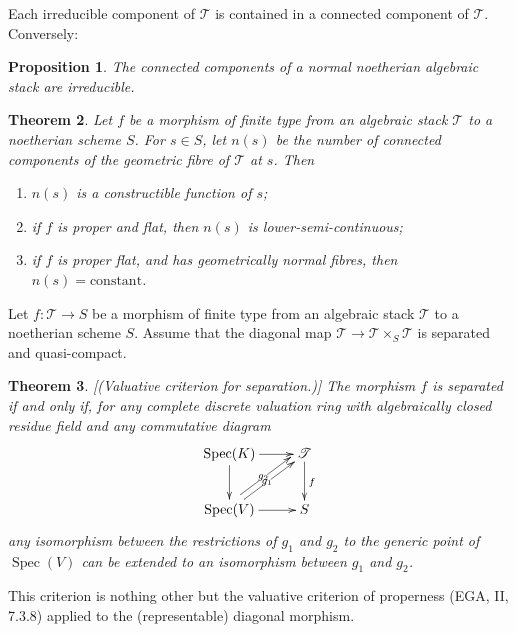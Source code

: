 \documentclass[10pt]{amsart}
\theoremstyle{plain}
\newtheorem{theorem}{Theorem}[section]
\newtheorem{proposition}[theorem]{Proposition}
\theoremstyle{definition}
\DeclareMathOperator{\Spec}{Spec}
\begin{document}
Each irreducible component of $\mathscr{T}$ is contained in a connected component of $\mathscr{T}$. Conversely:

\begin{proposition}\label{prop:4.16}
The connected components of a normal noetherian algebraic stack are irreducible.
\end{proposition}

\begin{theorem}\label{thm:4.17}
Let $f$ be a morphism of finite type from an algebraic stack $\mathscr{T}$ to a noetherian scheme $S$. For $s \in S$, let $n(s)$ be the number of connected components of the geometric fibre of $\mathscr{T}$ at $s$. Then
\begin{enumerate}
\item[(i)] $n(s)$ is a constructible function of $s$;
\item[(ii)] if $f$ is proper and flat, then $n(s)$ is lower-semi-continuous;
\item[(iii)] if $f$ is proper flat, and has geometrically normal fibres, then $n(s) = \text{constant}$.
\end{enumerate}
\end{theorem}

Let $f: \mathscr{T} \to S$ be a morphism of finite type from an algebraic stack $\mathscr{T}$ to a noetherian scheme $S$. Assume that the diagonal map $\mathscr{T} \to \mathscr{T} \times_S \mathscr{T}$ is separated and quasi-compact.

\begin{theorem}\label{thm:4.18}[(Valuative criterion for separation.)]
The morphism $f$ is separated if and only if, for any complete discrete valuation ring with algebraically closed residue field and any commutative diagram
\[
\xymatrix{
\Spec(K) \ar[r] \ar[d] & \mathscr{T} \ar[d]^f \\
\Spec(V) \ar[r] \ar[ur]|{g_1} \ar@<1ex>[ur]|{g_2} & S
}
\]
any isomorphism between the restrictions of $g_1$ and $g_2$ to the generic point of $\Spec(V)$ can be extended to an isomorphism between $g_1$ and $g_2$.
\end{theorem}

This criterion is nothing other but the valuative criterion of properness (EGA, II, 7.3.8) applied to the (representable) diagonal morphism.
\end{document}
